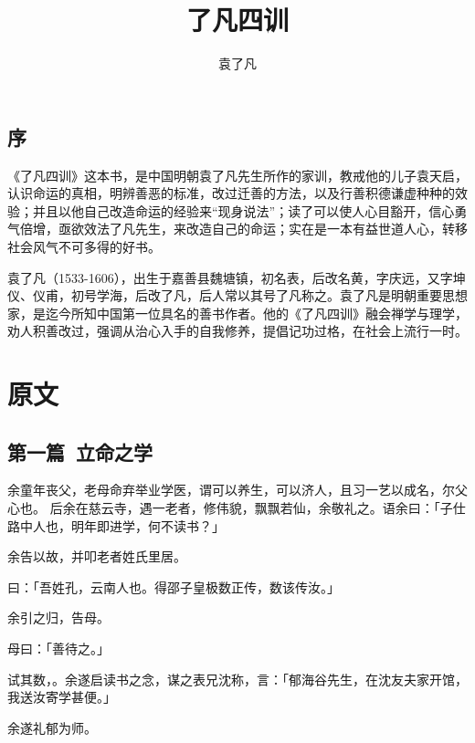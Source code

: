 \documentclass[12pt,twoside,openany]{book}
\title{了凡四训}
\author{袁了凡}
\date{}
\begin{document}

\maketitle
\tableofcontents
\newpage


\chapter*{序}
《了凡四训》这本书，是中国明朝袁了凡先生所作的家训，教戒他的儿子袁天启，认识命运的真相，明辨善恶的标准，改过迁善的方法，以及行善积德谦虚种种的效验；并且以他自己改造命运的经验来“现身说法”；读了可以使人心目豁开，信心勇气倍增，亟欲效法了凡先生，来改造自己的命运；实在是一本有益世道人心，转移社会风气不可多得的好书。

袁了凡（1533-1606），出生于嘉善县魏塘镇，初名表，后改名黄，字庆远，又字坤仪、仪甫，初号学海，后改了凡，后人常以其号了凡称之。袁了凡是明朝重要思想家，是迄今所知中国第一位具名的善书作者。他的《了凡四训》融会禅学与理学，劝人积善改过，强调从治心入手的自我修养，提倡记功过格，在社会上流行一时。

\part{原文}
\chapter{第一篇\ 立命之学}

余童年丧父，老母命弃举业学医，谓可以养生，可以济人，且习一艺以成名，尔父心也。
后余在慈云寺，遇一老者，修伟貌，飘飘若仙，余敬礼之。语余曰：「子仕路中人也，明年即进学，何不读书？」

余告以故，并叩老者姓氏里居。

曰：「吾姓孔，云南人也。得邵子皇极数正传，数该传汝。」

余引之归，告母。

母曰：「善待之。」

试其数，。余遂启读书之念，谋之表兄沈称，言：「郁海谷先生，在沈友夫家开馆，我送汝寄学甚便。」

余遂礼郁为师。
\end{document}
